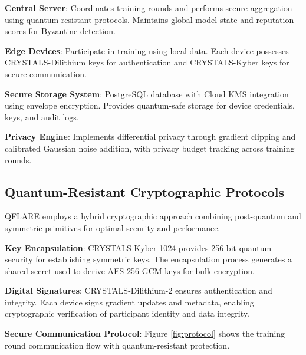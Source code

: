 \documentclass[conference]{IEEEtran}
\begin{document}
\textbf{Central Server}: Coordinates training rounds and performs secure aggregation using quantum-resistant protocols. Maintains global model state and reputation scores for Byzantine detection.

\textbf{Edge Devices}: Participate in training using local data. Each device possesses CRYSTALS-Dilithium keys for authentication and CRYSTALS-Kyber keys for secure communication.

\textbf{Secure Storage System}: PostgreSQL database with Cloud KMS integration using envelope encryption. Provides quantum-safe storage for device credentials, keys, and audit logs.

\textbf{Privacy Engine}: Implements differential privacy through gradient clipping and calibrated Gaussian noise addition, with privacy budget tracking across training rounds.

\subsection{Quantum-Resistant Cryptographic Protocols}

QFLARE employs a hybrid cryptographic approach combining post-quantum and symmetric primitives for optimal security and performance.

\textbf{Key Encapsulation}: CRYSTALS-Kyber-1024 provides 256-bit quantum security for establishing symmetric keys. The encapsulation process generates a shared secret used to derive AES-256-GCM keys for bulk encryption.

\textbf{Digital Signatures}: CRYSTALS-Dilithium-2 ensures authentication and integrity. Each device signs gradient updates and metadata, enabling cryptographic verification of participant identity and data integrity.

\textbf{Secure Communication Protocol}: Figure \ref{fig:protocol} shows the training round communication flow with quantum-resistant protection.
\end{document}
